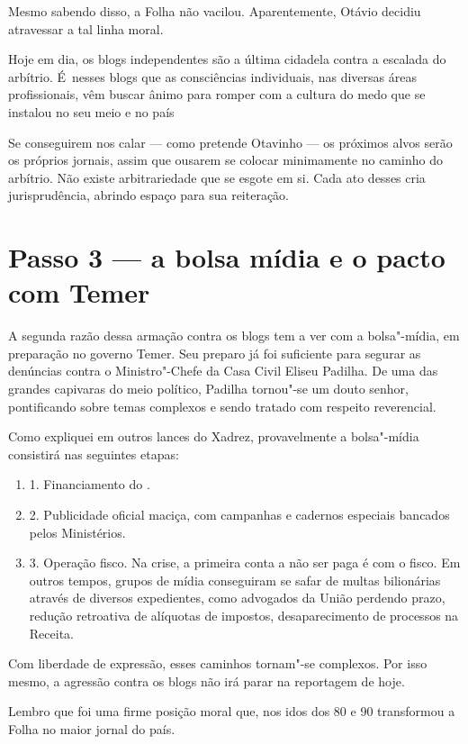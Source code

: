 Mesmo sabendo disso, a Folha não vacilou. Aparentemente, Otávio decidiu
atravessar a tal linha moral.

Hoje em dia, os blogs independentes são a última cidadela contra a
escalada do arbítrio. É~nesses blogs que as consciências individuais,
nas diversas áreas profissionais, vêm buscar ânimo para romper com a
cultura do medo que se instalou no seu meio e no país

Se conseguirem nos calar --- como pretende Otavinho --- os próximos
alvos serão os próprios jornais, assim que ousarem se colocar
minimamente no caminho do arbítrio. Não existe arbitrariedade que se
esgote em si. Cada ato desses cria jurisprudência, abrindo espaço para
sua reiteração.

\section{Passo 3 --- a bolsa mídia e o pacto com Temer}

A segunda razão dessa armação contra os blogs tem a ver com a
bolsa"-mídia, em preparação no governo Temer. Seu preparo já foi
suficiente para segurar as denúncias contra o Ministro"-Chefe da Casa
Civil Eliseu Padilha. De uma das grandes capivaras do meio político,
Padilha tornou"-se um douto senhor, pontificando sobre temas complexos e
sendo tratado com respeito reverencial.

Como expliquei em outros lances do Xadrez, provavelmente a bolsa"-mídia
consistirá nas seguintes etapas:

\begin{enumerate}
\itemsep1pt\parskip0pt
\item
  1. Financiamento do .
\item
  2. Publicidade oficial maciça, com campanhas e cadernos especiais
  bancados pelos Ministérios.
\item
  3. Operação fisco. Na crise, a primeira conta a não ser paga é com o
  fisco. Em outros tempos, grupos de mídia conseguiram se safar de
  multas bilionárias através de diversos expedientes, como advogados da
  União perdendo prazo, redução retroativa de alíquotas de impostos,
  desaparecimento de processos na Receita.
\end{enumerate}

Com liberdade de expressão, esses caminhos tornam"-se complexos. Por isso
mesmo, a agressão contra os blogs não irá parar na reportagem de hoje.

Lembro que foi uma firme posição moral que, nos idos dos 80 e 90
transformou a Folha no maior jornal do país.


